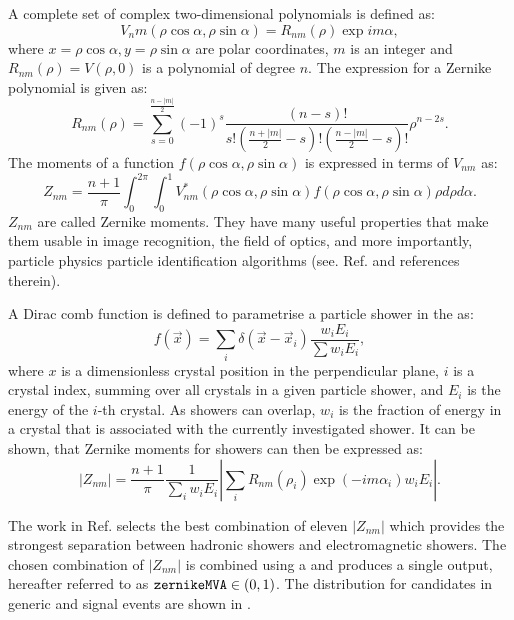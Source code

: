 A complete set of complex two-dimensional polynomials is defined as:
\begin{equation}
    V_nm(\rho\cos\alpha,\rho\sin\alpha) = R_{nm}(\rho)\exp{im\alpha},
\end{equation}
where ${x=\rho\cos\alpha, y=\rho\sin\alpha}$ are polar coordinates, $m$ is an integer and $R_{nm}(\rho)=V(\rho,0)$ is a polynomial of degree $n$.
The expression for a Zernike polynomial is given as:
\begin{equation}
    R_{nm}(\rho) = \sum^{\frac{n-|m|}{2}}_{s=0}(-1)^s \frac{(n-s)!}{ s! \left(\frac{n+|m|}{2}-s \right) ! \left( \frac{n-|m|}{2}-s\right) !}\rho^{n-2s}.
\end{equation}
The moments of a function $f(\rho\cos\alpha,\rho\sin\alpha)$ is expressed in terms of $V_{nm}$ as:
\begin{equation}
    Z_{nm} = \frac{n+1}{\pi} \int_0^{2\pi}\int^1_0 V^*_{nm}(\rho\cos\alpha,\rho\sin\alpha)f(\rho\cos\alpha, \rho\sin\alpha)\rho d\rho d\alpha.
\end{equation}
$Z_{nm}$ are called Zernike moments.
They have many useful properties that make them usable in image recognition, the field of optics, and more importantly, particle physics particle identification algorithms (see. Ref.\cite{Hershenhorn:2468} and references therein).

A Dirac comb function is defined to parametrise a particle shower in the \ECL as:
\begin{equation}
    f(\vec{x}) = \sum_i \delta(\vec{x}-\vec{x}_i)\frac{w_iE_i}{\sum w_iE_i},
\end{equation}
where $x$ is a dimensionless crystal position in the perpendicular plane, $i$ is a crystal index, summing over all crystals in a given particle shower, and $E_i$ is the energy of the $i$-th crystal.
As showers can overlap, $w_i$ is the fraction of energy in a crystal that is associated with the currently investigated shower.
It can be shown, that Zernike moments for \ECL showers can then be expressed as:
\begin{equation}
    |Z_{nm}| = \frac{n+1}{\pi}\frac{1}{\sum_iw_iE_i}\left|\sum_iR_{nm}(\rho_i)\exp(-im\alpha_i)w_iE_i\right|.
\end{equation}

The work in Ref.\cite{Hershenhorn:2468} selects the best combination of eleven $|Z_{nm}|$ which provides the strongest separation between hadronic showers and electromagnetic showers.
The chosen combination of $|Z_{nm}|$ is combined using a \BDT and produces a single output, hereafter referred to as ${\texttt{zernikeMVA}}\in(0,1)$.
The \ZMVA distribution for \BtoXsgamma candidates in generic \MC and signal \MC events are shown in .

